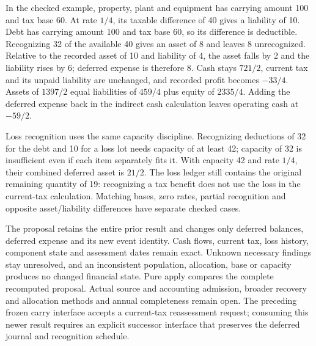 In the checked example, property, plant and equipment has carrying amount 100
and tax base 60. At rate $1/4$, its taxable difference of 40 gives a liability
of 10. Debt has carrying amount 100 and tax base 60, so its difference is
deductible. Recognizing 32 of the available 40 gives an asset of 8 and leaves 8
unrecognized. Relative to the recorded asset of 10 and liability of 4, the asset
falls by 2 and the liability rises by 6; deferred expense is therefore 8.
Cash stays $721/2$, current tax and its unpaid liability are unchanged, and
recorded profit becomes $-33/4$. Assets of $1397/2$ equal liabilities of $459/4$
plus equity of $2335/4$. Adding the deferred expense back in the indirect cash
calculation leaves operating cash at $-59/2$.

Loss recognition uses the same capacity discipline. Recognizing deductions of
32 for the debt and 10 for a loss lot needs capacity of at least 42; capacity
of 32 is insufficient even if each item separately fits it. With capacity 42
and rate $1/4$, their combined deferred asset is $21/2$. The loss ledger still
contains the original remaining quantity of 19: recognizing a tax benefit does
not use the loss in the current-tax calculation. Matching bases, zero rates,
partial recognition and opposite asset/liability differences have separate
checked cases.

The proposal retains the entire prior result and changes only deferred balances,
deferred expense and its new event identity. Cash flows, current tax, loss
history, component state and assessment dates remain exact. Unknown necessary
findings stay unresolved, and an inconsistent population, allocation, base or
capacity produces no changed financial state. Pure apply compares the complete
recomputed proposal. Actual source and accounting admission, broader recovery
and allocation methods and annual completeness remain open. The preceding
frozen carry interface accepts a current-tax reassessment request; consuming
this newer result requires an explicit successor interface that preserves the
deferred journal and recognition schedule.
